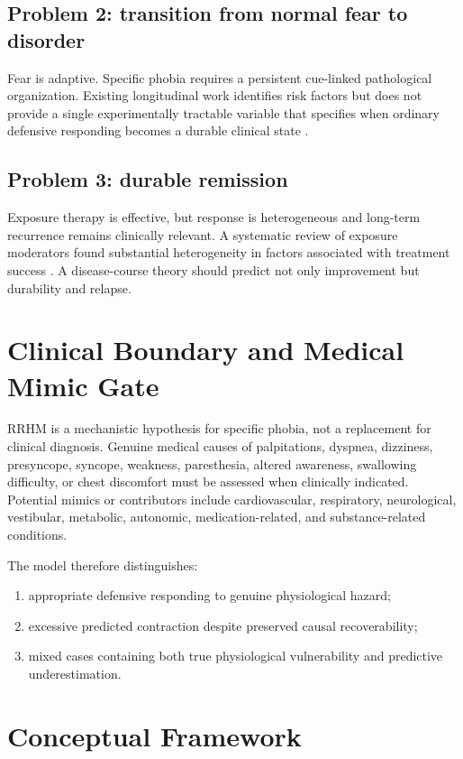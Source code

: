 \documentclass[11pt]{article}
\begin{document}
\subsection{Problem 2: transition from normal fear to disorder}
Fear is adaptive. Specific phobia requires a persistent cue-linked pathological organization. Existing longitudinal work identifies risk factors but does not provide a single experimentally tractable variable that specifies when ordinary defensive responding becomes a durable clinical state \cite{trumpf2010incidence}.

\subsection{Problem 3: durable remission}
Exposure therapy is effective, but response is heterogeneous and long-term recurrence remains clinically relevant. A systematic review of exposure moderators found substantial heterogeneity in factors associated with treatment success \cite{bohnlein2020}. A disease-course theory should predict not only improvement but durability and relapse.

\section{Clinical Boundary and Medical Mimic Gate}
RRHM is a mechanistic hypothesis for specific phobia, not a replacement for clinical diagnosis. Genuine medical causes of palpitations, dyspnea, dizziness, presyncope, syncope, weakness, paresthesia, altered awareness, swallowing difficulty, or chest discomfort must be assessed when clinically indicated. Potential mimics or contributors include cardiovascular, respiratory, neurological, vestibular, metabolic, autonomic, medication-related, and substance-related conditions.

The model therefore distinguishes:
\begin{enumerate}[leftmargin=2em]
\item appropriate defensive responding to genuine physiological hazard;
\item excessive predicted contraction despite preserved causal recoverability;
\item mixed cases containing both true physiological vulnerability and predictive underestimation.
\end{enumerate}

\section{Conceptual Framework}
\end{document}
